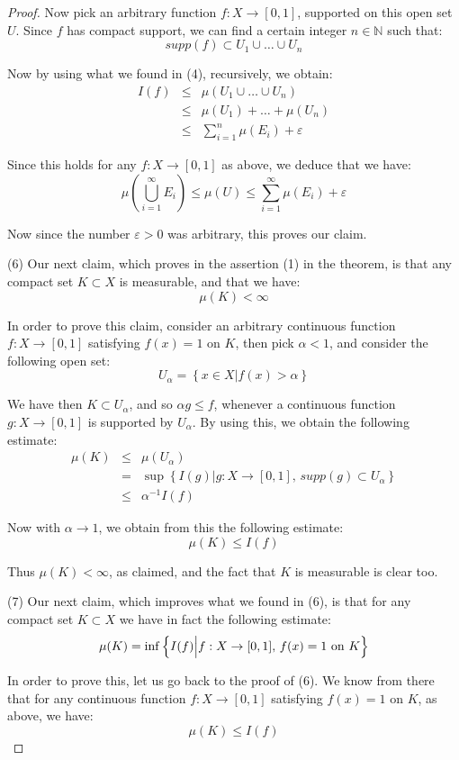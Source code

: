 \documentclass[12pt]{amsbook}
\begin{document}
\begin{proof}
Now pick an arbitrary function $f:X\to[0,1]$, supported on this open set $U$. Since $f$ has compact support, we can find a certain integer $n\in\mathbb N$ such that:
$$supp(f)\subset U_1\cup\ldots\cup U_n$$

Now by using what we found in (4), recursively, we obtain:
\begin{eqnarray*}
I(f)
&\leq&\mu(U_1\cup\ldots\cup U_n)\\
&\leq&\mu(U_1)+\ldots+\mu(U_n)\\
&\leq&\sum_{i=1}^n\mu(E_i)+\varepsilon
\end{eqnarray*}

Since this holds for any $f:X\to[0,1]$ as above, we deduce that we have:
$$\mu\left(\bigcup_{i=1}^\infty E_i\right)
\leq\mu(U)
\leq\sum_{i=1}^\infty\mu(E_i)+\varepsilon$$

Now since the number $\varepsilon>0$ was arbitrary, this proves our claim.

\medskip

(6) Our next claim, which proves in the assertion (1) in the theorem, is that any compact set $K\subset X$ is measurable, and that we have:
$$\mu(K)<\infty$$

In order to prove this claim, consider an arbitrary continuous function $f:X\to[0,1]$ satisfying $f(x)=1$ on $K$, then pick $\alpha<1$, and consider the following open set:
$$U_\alpha=\left\{x\in X\Big|f(x)>\alpha\right\}$$

We have then $K\subset U_\alpha$, and so $\alpha g\leq f$, whenever a continuous function $g:X\to[0,1]$ is supported by $U_\alpha$. By using this, we obtain the following estimate:
\begin{eqnarray*}
\mu(K)
&\leq&
\mu(U_\alpha)\\
&=&\sup\left\{I(g)\Big|g:X\to[0,1],\,supp(g)\subset U_\alpha\right\}\\
&\leq&\alpha^{-1}I(f)
\end{eqnarray*}

Now with $\alpha\to 1$, we obtain from this the following estimate:
$$\mu(K)\leq I(f)$$

Thus $\mu(K)<\infty$, as claimed, and the fact that $K$ is measurable is clear too.

\medskip

(7) Our next claim, which improves what we found in (6), is that for any compact set $K\subset X$ we have in fact the following estimate:
$$\mu(K)=\inf\left\{I(f)\Big|f:X\to[0,1],\,f(x)=1\ {\rm on}\ K\right\}$$

In order to prove this, let us go back to the proof of (6). We know from there that for any continuous function $f:X\to[0,1]$ satisfying $f(x)=1$ on $K$, as above, we have:
$$\mu(K)\leq I(f)$$


\end{proof}
\end{document}
